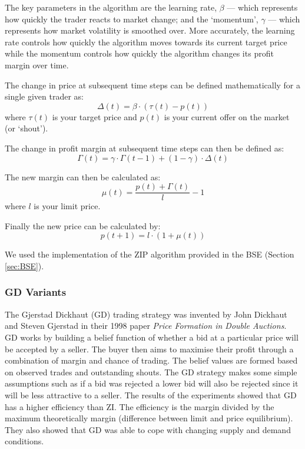 \documentclass[preprint]{acm_proc_article-sp} %
\begin{document}
The key parameters in the algorithm are the learning rate, $\beta$ --- which represents how quickly the trader reacts to market change; and the `momentum', $\gamma$ --- which represents how market 
volatility is smoothed over. More accurately, the learning rate controls how quickly the algorithm 
moves towards its current target price while the momentum controls how quickly the algorithm changes 
its profit margin over time.

The change in price at subsequent time steps can be defined mathematically for a single given trader as:
\begin{equation}
    \label{eqn:change_in_price}
    \Delta(t) = \beta \cdot ( \tau(t) - p(t))
\end{equation}
where $\tau(t)$ is your target price and $p(t)$ is your current offer on the market (or `shout').

The change in profit margin at subsequent time steps can then be defined as:
\begin{equation}
    \label{eqn:change_in_margin}
    \Gamma(t) = \gamma \cdot \Gamma(t-1) + (1 - \gamma) \cdot \Delta(t)
\end{equation}

The new margin can then be calculated as:
\begin{equation}
    \label{eqn:new_margin}
    \mu(t) = \frac{p(t) + \Gamma(t)}{l} - 1
\end{equation}
where $l$ is your limit price.

Finally the new price can be calculated by:
\begin{equation}
    \label{eqn:new_price}
    p(t+1) = l \cdot (1 + \mu(t))
\end{equation}

We used the implementation of the ZIP algorithm provided in the BSE (Section \ref{sec:BSE}).\\


\subsubsection{GD Variants} \label{sec:traders_GDV}

The Gjerstad Dickhaut (GD) trading strategy was invented by John Dickhaut and
Steven Gjerstad in their 1998 paper \emph{Price Formation in Double
Auctions}\cite{gd}.
GD works by building a belief function of whether a bid at a particular price
will be accepted by a seller.
The buyer then aims to maximise their profit through a combination of margin
and chance of trading.
The belief values are formed based on observed trades and outstanding shouts.
The GD strategy makes some simple assumptions such as if a bid was rejected a
lower bid will also be rejected since it will be less attractive to a seller.
The results of the experiments showed that GD has a higher efficiency than ZI.
The efficiency is the margin divided by the maximum theoretically margin
(difference between limit and price equilibrium).
They also showed that GD was able to cope with changing supply and demand
conditions.
\end{document}
